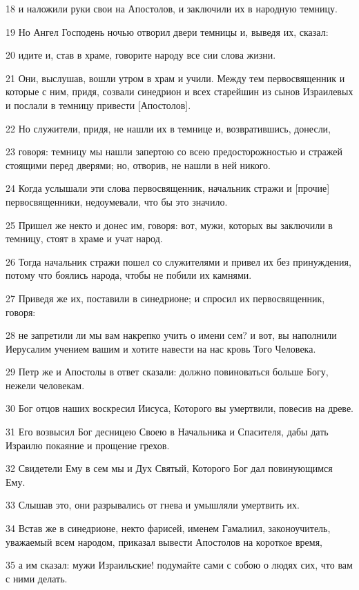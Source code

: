 \par 18 и наложили руки свои на Апостолов, и заключили их в народную темницу.
\par 19 Но Ангел Господень ночью отворил двери темницы и, выведя их, сказал:
\par 20 идите и, став в храме, говорите народу все сии слова жизни.
\par 21 Они, выслушав, вошли утром в храм и учили. Между тем первосвященник и которые с ним, придя, созвали синедрион и всех старейшин из сынов Израилевых и послали в темницу привести [Апостолов].
\par 22 Но служители, придя, не нашли их в темнице и, возвратившись, донесли,
\par 23 говоря: темницу мы нашли запертою со всею предосторожностью и стражей стоящими перед дверями; но, отворив, не нашли в ней никого.
\par 24 Когда услышали эти слова первосвященник, начальник стражи и [прочие] первосвященники, недоумевали, что бы это значило.
\par 25 Пришел же некто и донес им, говоря: вот, мужи, которых вы заключили в темницу, стоят в храме и учат народ.
\par 26 Тогда начальник стражи пошел со служителями и привел их без принуждения, потому что боялись народа, чтобы не побили их камнями.
\par 27 Приведя же их, поставили в синедрионе; и спросил их первосвященник, говоря:
\par 28 не запретили ли мы вам накрепко учить о имени сем? и вот, вы наполнили Иерусалим учением вашим и хотите навести на нас кровь Того Человека.
\par 29 Петр же и Апостолы в ответ сказали: должно повиноваться больше Богу, нежели человекам.
\par 30 Бог отцов наших воскресил Иисуса, Которого вы умертвили, повесив на древе.
\par 31 Его возвысил Бог десницею Своею в Начальника и Спасителя, дабы дать Израилю покаяние и прощение грехов.
\par 32 Свидетели Ему в сем мы и Дух Святый, Которого Бог дал повинующимся Ему.
\par 33 Слышав это, они разрывались от гнева и умышляли умертвить их.
\par 34 Встав же в синедрионе, некто фарисей, именем Гамалиил, законоучитель, уважаемый всем народом, приказал вывести Апостолов на короткое время,
\par 35 а им сказал: мужи Израильские! подумайте сами с собою о людях сих, что вам с ними делать.
